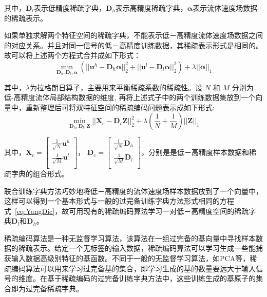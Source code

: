 其中，$\boldsymbol D_l$表示低精度稀疏字典，$\boldsymbol D_h$表示高精度稀疏字典，$\boldsymbol \alpha$表示流体速度场数据的稀疏表示。

如果单独求解两个特征空间的稀疏字典，不能表示低－高精度流体速度场数据之间的对应关系。并且对同一信号的低－高精度训练数据，其稀疏表示形式是相同的。故可以将上述两个方程式合并成如下形式：
\begin{equation}
\min_{\boldsymbol D_h, \boldsymbol D_l, \boldsymbol \alpha}(||\boldsymbol u^h - \boldsymbol D_h \boldsymbol \alpha||_2^2 + ||\boldsymbol u^l - \boldsymbol D_l \boldsymbol \alpha||_2^2) + \lambda||\boldsymbol \alpha||_1
\end{equation}

其中，$\lambda$为拉格朗日算子，主要用来平衡稀疏系数的稀疏性。设 $N$ 和 $M$ 分别为低-高精度流体局部结构数据的维度, 再将上述式子中的两个训练数据集放到一个向量中，重新整理后可将双特征空间的稀疏编码问题表示成如下形式:
\begin{equation}
\label{eq:YangDic}
\min_{\boldsymbol D_h, \boldsymbol D_l, \boldsymbol Z}||\boldsymbol X_c - \boldsymbol D_c \boldsymbol Z||_2^2 + \lambda(\frac{1}{N} + \frac{1}{M})||\boldsymbol Z||_1
\end{equation}

其中，$\boldsymbol X_c = \left[\begin{array}{c} \frac{1}{\sqrt N}\boldsymbol u^h \\
\frac{1}{\sqrt M}\boldsymbol u^l\\
\end{array}
\right]
$，
$\boldsymbol D_c = \left[\begin{array}{c} \frac{1}{\sqrt N}\boldsymbol D_h \\
\frac{1}{\sqrt M}\boldsymbol D_l\\
\end{array}
\right]$，分别是是低－高精度样本数据和稀疏字典的组合形式。

联合训练字典方法巧妙地将低－高精度的流体速度场样本数据放到了一个向量中，这样可以得到一个基本形式与一般的过完备训练字典方法形式相同的方程式~\ref{eq:YangDic}，故可用现有的稀疏编码算法学习一对低－高精度空间的稀疏字典$\boldsymbol D_l$和$\boldsymbol D_h$。

稀疏编码算法是一种无监督学习算法，该算法在一组过完备的基向量中寻找样本数据的稀疏表示。给定一个无标签的输入数据，稀疏编码算法可以学习生成一些能捕获输入数据高级别特征的基函数。不同于一般的无监督学习算法，如PCA等，稀疏编码算法可以用来学习过完备基的集合，即学习生成的基的数量要远大于输入信号的维度。在基于稀疏编码的过完备训练字典方法中，这些训练生成的基原子的集合即为过完备稀疏字典。

